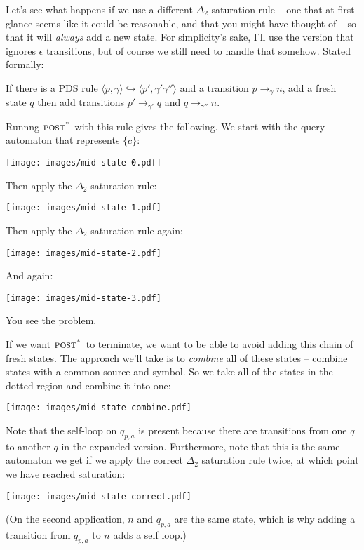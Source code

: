 \documentclass{article}
\newcommand{\Config}[2]{\ensuremath{\langle #1, #2 \rangle}}
\newcommand{\Rule}[2]{\ensuremath{#1 \hookrightarrow #2}}
\newcommand{\Trans}[3]{\ensuremath{#1 \rightarrow_{#2} #3}}
\newcommand{\poststar}{\ensuremath{\textsc{post}^\textsc{*}}}
\begin{document}
Let's see what happens if we use a different $\Delta_2$ saturation
rule -- one that at first glance seems like it could be reasonable,
and that you might have thought of -- so that it will \emph{always}
add a new state. For simplicity's sake, I'll use the version that
ignores $\epsilon$ transitions, but of course we still need to handle
that somehow. Stated formally:

   If there is a PDS rule
   \Rule{\Config{p}{\gamma}}{\Config{p'}{\gamma'\gamma''}} and a
   transition \Trans{p}{\gamma}{n}, add a fresh state $q$ then add
   transitions \Trans{p'}{\gamma'}{q} and \Trans{q}{\gamma''}{n}.

Runnng \poststar\ with this rule gives the following. We start with the
query automaton that represents $\{c\}$:
\begin{center}
  \texttt{[image: images/mid-state-0.pdf]}
\end{center}

Then apply the $\Delta_2$ saturation rule:
\begin{center}
  \texttt{[image: images/mid-state-1.pdf]}
\end{center}

Then apply the $\Delta_2$ saturation rule again:
\begin{center}
  \texttt{[image: images/mid-state-2.pdf]}
\end{center}

And again:
\begin{center}
  \texttt{[image: images/mid-state-3.pdf]}
\end{center}

You see the problem.

If we want \poststar\ to terminate, we want to be able to avoid adding
this chain of fresh states. The approach we'll take is to
\emph{combine} all of these states -- combine states with a common
source and symbol. So we take all of the states in the dotted region
and combine it into one:
\begin{center}
  \texttt{[image: images/mid-state-combine.pdf]}
\end{center}


Note that the self-loop on $q_{p,a}$ is present because there are
transitions from one $q$ to another $q$ in the expanded
version. Furthermore, note that this is the same automaton we get if
we apply the correct $\Delta_2$ saturation rule twice, at which point
we have reached saturation:
\begin{center}
  \texttt{[image: images/mid-state-correct.pdf]}
\end{center}
(On the second application, $n$ and $q_{p,a}$ are the same state,
which is why adding a transition from $q_{p,a}$ to $n$ adds a self
loop.)
\end{document}
